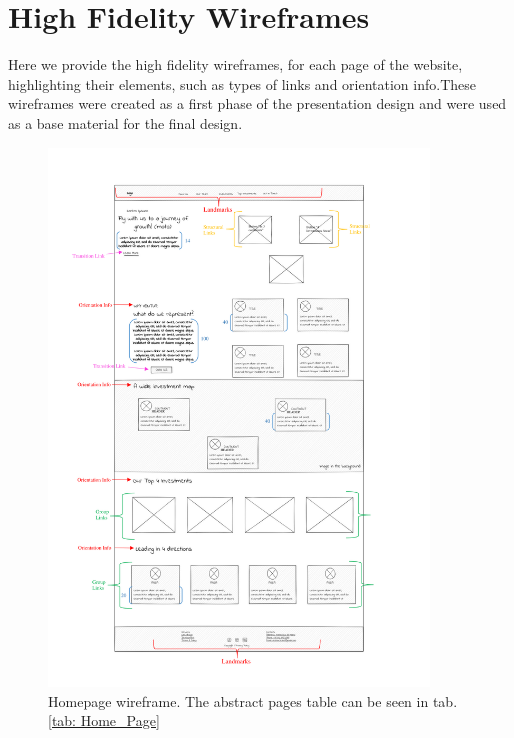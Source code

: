 \section{High Fidelity Wireframes}\label{section:WireframeAnnex}
Here we provide the high fidelity wireframes, for each page of the website, highlighting their elements, such as types of links and orientation info.These wireframes were created as a first phase of the presentation design and were used as a base material for the final design.\\

\begin{figure}[!htb]
    \centering
    \includegraphics[width=0.9\textwidth]{Images/Wireframes/Home Page Wireframee.png}
    \caption{Homepage wireframe. The abstract pages table can be seen in tab. \ref{tab: Home_Page}}
    \label{fig: HomepageWireframe}
\end{figure}

